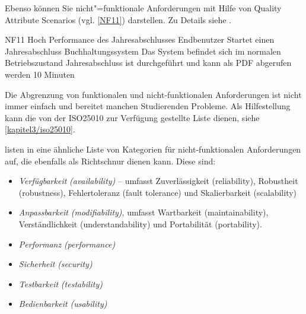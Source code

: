 Ebenso können Sie nicht"=funktionale Anforderungen mit Hilfe von Quality Attribute Scenarios (vgl. \autoref{NF11}) darstellen. Zu Details siehe \autocite{Barbacci2003}.

\qas %
   {NF11} %
   {Hoch} %
   {Performance des Jahresabschlusses} %
   {Endbenutzer} %
   {Startet einen Jahresabschluss} %
   {Buchhaltungssystem} %
   {Das System befindet sich im normalen Betriebszustand} %
   {Jahresabschluss ist durchgeführt und kann als PDF abgerufen werden} %
   {10 Minuten} %

Die Abgrenzung von funktionalen und nicht-funktionalen Anforderungen ist nicht immer einfach und bereitet manchen Studierenden Probleme. Als Hilfestellung kann die von der ISO25010 \autocite{ISO25010} zur Verfügung gestellte Liste dienen, siehe \autoref{kapitel3/iso25010}.


\citeauthor{Bass2003} listen in \autocite{Bass2003} eine ähnliche Liste von Kategorien für nicht-funktionalen Anforderungen auf, die ebenfalls als Richtschnur dienen kann. Diese sind:

\begin{itemize}
  \item \textit{Verfügbarkeit} \textit{(availability)} -- umfasst Zuverlässigkeit (reliability), Robustheit (robustness), Fehlertoleranz (fault tolerance) und Skalierbarkeit (scalability)
  \item \textit{Anpassbarkeit} \textit{(modifiability)}, umfasst Wartbarkeit (maintainability), Verständlichkeit (understandability) und Portabilität (portability).
  \item \textit{Performanz} \textit{(performance)}
  \item \textit{Sicherheit} \textit{(security)}
  \item \textit{Testbarkeit} \textit{(testability)}
  \item \textit{Bedienbarkeit} \textit{(usability)}
\end{itemize}

